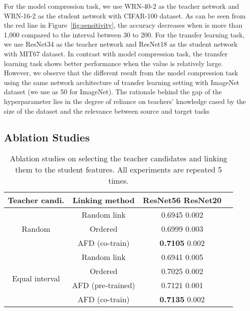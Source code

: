 For the model compression task, we use WRN-40-2 as the teacher network and WRN-16-2 as the student network with CIFAR-100 dataset. As can be seen from the red line in Figure~\ref{fig:sensitivity}, the accuracy decreases when  is more than 1,000 compared to the interval between 30 to 200. For the transfer learning task, we use ResNet34 as the teacher network and ResNet18 as the student network with MIT67 dataset. In contrast with model compression task, the transfer learning task shows better performance when the  value is relatively large. However, we observe that the different result from the model compression task using the same network architecture of transfer learning setting with ImageNet dataset (we use  as 50 for ImageNet). The rationale behind the gap of the hyperparameter lies in the degree of reliance on teachers' knowledge cased by the size of the dataset and the relevance between source and target tasks \cite{sp,vid,rkds}

\subsection{Ablation Studies}

\begin{table}[h]
\tabcolsep=0.17cm
\centering
\begin{tabular}{cc|cc}
\toprule
 \small{Teacher candi.} & \small{Linking method} & \small{ResNet56  ResNet20}  \\ \midrule
 \multirow{3}{*}{\small{Random}}  & \small{Random link}       & 0.6945  0.002             \\ 
   & \small{Ordered} & 0.6999  0.003                     \\  
   & \small{AFD (co-train)}       &  \textbf{0.7105}  0.002                 \\
\midrule
\multirow{4}{*}{\small{Equal interval}} & \small{Random link}         & 0.6941  0.005               \\
  & \small{Ordered}          & 0.7025  0.002               \\
  & \small{AFD (pre-trained)}      & 0.7121  0.001      \\ 
  & \small{AFD (co-train)}          & \textbf{0.7135}  0.002          \\ \bottomrule
\end{tabular}
\vspace{0.3em}
\caption{Ablation studies on selecting the teacher candidates and linking them to the student features. All experiments are repeated 5 times.}
\label{table:2+3}
\end{table}

